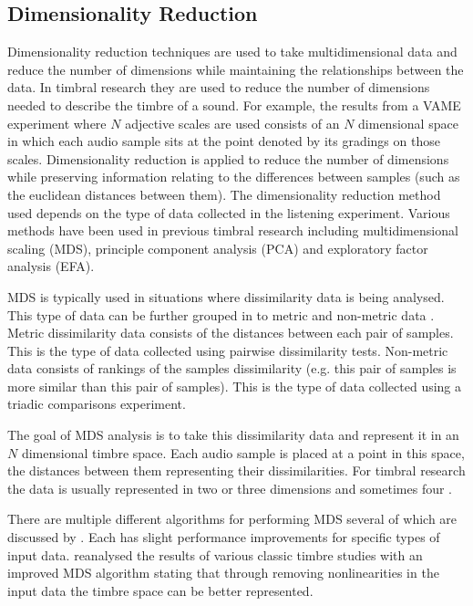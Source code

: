 	\subsection{Dimensionality Reduction}
	\label{sec:Timbre-Parameterisation-DimensionalityReduction}
		Dimensionality reduction techniques are used to take multidimensional data and reduce the number of
		dimensions while maintaining the relationships between the data. In timbral research they are used to reduce
		the number of dimensions needed to describe the timbre of a sound. For example, the results from a VAME
		experiment where $N$ adjective scales are used consists of an $N$ dimensional space in which each audio
		sample sits at the point denoted by its gradings on those scales. Dimensionality reduction is applied to
		reduce the number of dimensions while preserving information relating to the differences between samples
		(such as the euclidean distances between them). The dimensionality reduction method used depends on the type
		of data collected in the listening experiment.  Various methods have been used in previous timbral research
		including multidimensional scaling (MDS), principle component analysis (PCA) and exploratory factor analysis
		(EFA).

		MDS is typically used in situations where dissimilarity data is being analysed. This type of data can be
		further grouped in to metric and non-metric data \citep{hair2013multivariate}. Metric dissimilarity data
		consists of the distances between each pair of samples. This is the type of data collected using pairwise
		dissimilarity tests. Non-metric data consists of rankings of the samples dissimilarity (e.g. this pair of
		samples is more similar than this pair of samples). This is the type of data collected using a triadic
		comparisons experiment.

		The goal of MDS analysis is to take this dissimilarity data and represent it in an $N$ dimensional timbre
		space.  Each audio sample is placed at a point in this space, the distances between them representing their
		dissimilarities. For timbral research the data is usually represented in two \citep{giragama2003relating}
		or three \citep{grey1978perceptual} dimensions and sometimes four \citep{bernays2011verbal}.
		
		There are multiple different algorithms for performing MDS several of which are discussed by
		\citet{mcadams1999perspectives}. Each has slight performance improvements for specific types of input data.
		\citet{burgoyne2008a} reanalysed the results of various classic timbre studies with an improved MDS
		algorithm stating that through removing nonlinearities in the input data the timbre space can be better
		represented.

